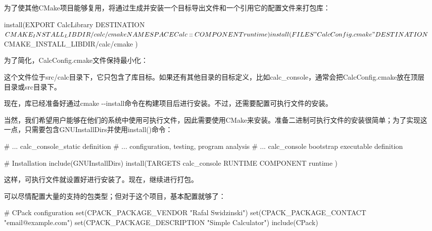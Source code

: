 为了使其他CMake项目能够复用，将通过生成并安装一个目标导出文件和一个引用它的配置文件来打包库：


\begin{cmake}
install(EXPORT CalcLibrary
    DESTINATION ${CMAKE_INSTALL_LIBDIR}/calc/cmake
    NAMESPACE Calc::
    COMPONENT runtime
)

install(FILES "CalcConfig.cmake"
    DESTINATION ${CMAKE_INSTALL_LIBDIR}/calc/cmake
)
\end{cmake}

为了简化，CalcConfig.cmake文件保持最小化：



这个文件位于src/calc目录下，它只包含了库目标。如果还有其他目录的目标定义，比如calc\_console，通常会把CalcConfig.cmake放在顶层目录或src目录下。

现在，库已经准备好通过cmake -{}-install命令在构建项目后进行安装。不过，还需要配置可执行文件的安装。


当然，我们希望用户能够在他们的系统中使用可执行文件，因此需要使用CMake来安装。准备二进制可执行文件的安装很简单；为了实现这一点，只需要包含GNUInstallDirs并使用install()命令：


\begin{cmake}
# ... calc_console_static definition
# ... configuration, testing, program analysis
# ... calc_console bootstrap executable definition

# Installation
include(GNUInstallDirs)
install(TARGETS calc_console
    RUNTIME COMPONENT runtime
)
\end{cmake}

这样，可执行文件就设置好进行安装了。现在，继续进行打包。


可以尽情配置大量的支持的包类型；但对于这个项目，基本配置就够了：


\begin{cmake}
# CPack configuration
set(CPACK_PACKAGE_VENDOR "Rafal Swidzinski")
set(CPACK_PACKAGE_CONTACT "email@example.com")
set(CPACK_PACKAGE_DESCRIPTION "Simple Calculator")
include(CPack)
\end{cmake}


